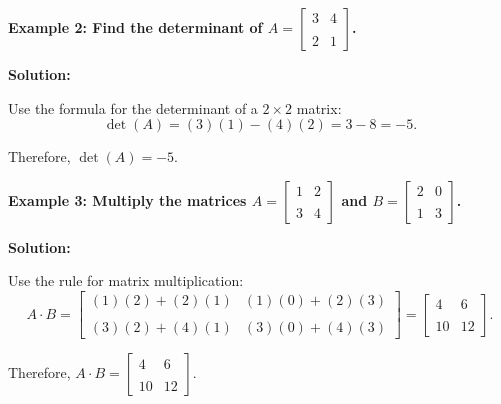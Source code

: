 \begin{flushleft}
\textbf{Example 2: Find the determinant of $A = \begin{bmatrix} 3 & 4 \\\\ 2 & 1 \end{bmatrix}$.}

\vspace{0.5cm}
\textbf{Solution:}
\vspace{0.5cm}

Use the formula for the determinant of a $2 \times 2$ matrix:
\[
\det(A) = (3)(1) - (4)(2) = 3 - 8 = -5.
\]

Therefore, $\det(A) = -5$.
\end{flushleft}

\begin{flushleft}
\textbf{Example 3: Multiply the matrices $A = \begin{bmatrix} 1 & 2 \\\\ 3 & 4 \end{bmatrix}$ and $B = \begin{bmatrix} 2 & 0 \\\\ 1 & 3 \end{bmatrix}$.}

\vspace{0.5cm}
\textbf{Solution:}
\vspace{0.5cm}

Use the rule for matrix multiplication:
\[
A \cdot B = \begin{bmatrix} (1)(2)+(2)(1) & (1)(0)+(2)(3) \\\\ (3)(2)+(4)(1) & (3)(0)+(4)(3) \end{bmatrix} = \begin{bmatrix} 4 & 6 \\\\ 10 & 12 \end{bmatrix}.
\]

Therefore, $A \cdot B = \begin{bmatrix} 4 & 6 \\\\ 10 & 12 \end{bmatrix}$.
\end{flushleft}

